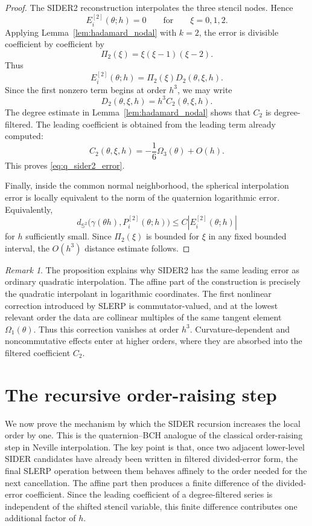 \documentclass[a4paper,11pt]{article}
\newcommand{\bS}{\mathbb{S}}
\numberwithin{equation}{section}
\theoremstyle{plain}
\theoremstyle{definition}
\theoremstyle{remark}
\newtheorem{remark}[thm]{Remark}
\begin{document}
\begin{proof}
The SIDER2 reconstruction interpolates the three stencil nodes.  Hence
\[
        E_i^{[2]}(\theta;h)=0
        \qquad\text{for}\qquad
        \xi=0,1,2.
\]
Applying Lemma~\ref{lem:hadamard_nodal} with \(k=2\), the error is divisible
coefficient by coefficient by
\[
        \Pi_2(\xi)=\xi(\xi-1)(\xi-2).
\]
Thus
\[
        E_i^{[2]}(\theta;h)=\Pi_2(\xi)D_2(\theta,\xi,h).
\]
Since the first nonzero term begins at order \(h^3\), we may write
\[
        D_2(\theta,\xi,h)=h^3 C_2(\theta,\xi,h).
\]
The degree estimate in Lemma~\ref{lem:hadamard_nodal} shows that \(C_2\) is
degree-filtered.  The leading coefficient is obtained from the leading term
already computed:
\[
        C_2(\theta,\xi,h)
        =
        -\frac16\Omega_3(\theta)+O(h).
\]
This proves \eqref{eq:q_sider2_error}.

Finally, inside the common normal neighborhood, the spherical interpolation
error is locally equivalent to the norm of the quaternion logarithmic error.
Equivalently,
\[
        d_{\bS^2}\bigl(\gamma(\theta h),P_i^{[2]}(\theta;h)\bigr)
        \leq C\left|E_i^{[2]}(\theta;h)\right|
\]
for \(h\) sufficiently small.  Since \(\Pi_2(\xi)\) is bounded for \(\xi\) in
any fixed bounded interval, the \(O(h^3)\) distance estimate follows.
\end{proof}

\begin{remark}
The proposition explains why SIDER2 has the same leading error as ordinary
quadratic interpolation.  The affine part of the construction is precisely the
quadratic interpolant in logarithmic coordinates.  The first nonlinear
correction introduced by SLERP is commutator-valued, and at the lowest
relevant order the data are collinear multiples of the same tangent element
\(\Omega_1(\theta)\).  Thus this correction vanishes at order \(h^3\).
Curvature-dependent and noncommutative effects enter at higher orders, where
they are absorbed into the filtered coefficient \(C_2\).
\end{remark}

\section{The recursive order-raising step}
\label{sec:recursive_order_raising}

We now prove the mechanism by which the SIDER recursion increases the local
order by one.  This is the quaternion--BCH analogue of the classical
order-raising step in Neville interpolation.  The key point is that, once two
adjacent lower-level SIDER candidates have already been written in filtered
divided-error form, the final SLERP operation between them behaves affinely to
the order needed for the next cancellation.  The affine part then produces a
finite difference of the divided-error coefficient.  Since the leading
coefficient of a degree-filtered series is independent of the shifted stencil
variable, this finite difference contributes one additional factor of \(h\).
\end{document}
